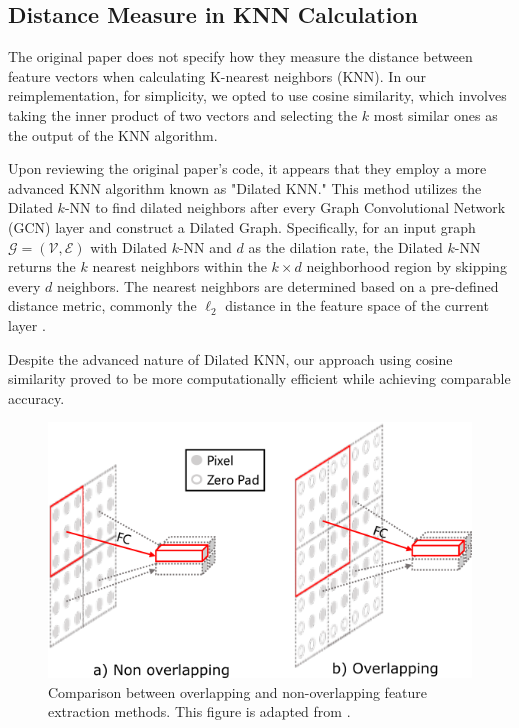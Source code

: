 \documentclass[sigconf, nonacm]{acmart}
\begin{document}
\subsection{Distance Measure in KNN Calculation}
The original paper does not specify how they measure the distance between feature vectors when calculating K-nearest neighbors (KNN). In our reimplementation, for simplicity, we opted to use cosine similarity, which involves taking the inner product of two vectors and selecting the $k$ most similar ones as the output of the KNN algorithm.

Upon reviewing the original paper's code, it appears that they employ a more advanced KNN algorithm known as "Dilated KNN." This method utilizes the Dilated $k$-NN to find dilated neighbors after every Graph Convolutional Network (GCN) layer and construct a Dilated Graph. Specifically, for an input graph $\mathcal{G}=(\mathcal{V}, \mathcal{E})$ with Dilated $k$-NN and $d$ as the dilation rate, the Dilated $k$-NN returns the $k$ nearest neighbors within the $k\times d$ neighborhood region by skipping every $d$ neighbors. The nearest neighbors are determined based on a pre-defined distance metric, commonly the $\ell_2$ distance in the feature space of the current layer \cite{deepgcns}.

Despite the advanced nature of Dilated KNN, our approach using cosine similarity proved to be more computationally efficient while achieving comparable accuracy.

\begin{figure}[t]
  \centering
  \includegraphics[width=0.9\linewidth]{figures/overlapping_nonoverlapping.png}
  \caption{Comparison between overlapping and non-overlapping feature extraction methods. This figure is adapted from \cite{pvtv2}.}
  \label{fig:overlapping_nonoverlapping}
\end{figure}
\end{document}
